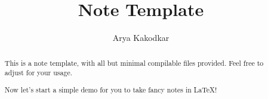 \documentclass[a4paper]{report}
\author{Arya Kakodkar}
\title{Note Template}
\begin{document}
\maketitle

\begin{abstract}
	This is a note template, with all but minimal compilable files provided. Feel free to adjust for your usage.

	Now let's start a simple demo for you to take fancy notes in \LaTeX!
\end{abstract}

\newpage

\tableofcontents






\printbibliography
\end{document}
